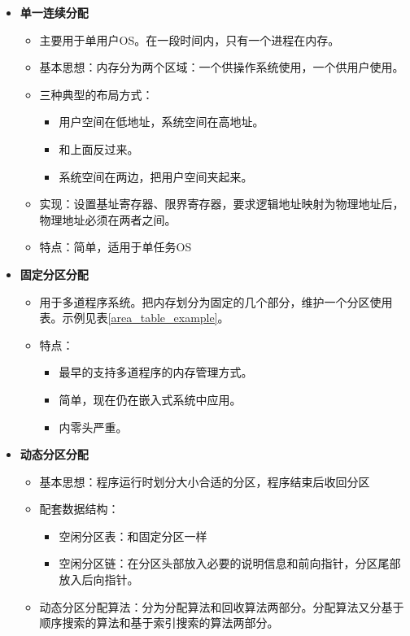 \documentclass[12pt, a4paper, oneside]{ctexart}
\begin{document}
\begin{itemize}
  \item {\bf 单一连续分配}
  \begin{itemize}
    \item 主要用于单用户OS。在一段时间内，只有一个进程在内存。
    \item 基本思想：内存分为两个区域：一个供操作系统使用，一个供用户使用。
    \item 三种典型的布局方式：
    \begin{itemize}
      \item 用户空间在低地址，系统空间在高地址。
      \item 和上面反过来。
      \item 系统空间在两边，把用户空间夹起来。
    \end{itemize}
    \item 实现：设置基址寄存器、限界寄存器，要求逻辑地址映射为物理地址后，物理地址必须在两者之间。
    \item 特点：简单，适用于单任务OS
  \end{itemize}
  \item {\bf 固定分区分配}
  \begin{itemize}
    \item 用于多道程序系统。把内存划分为固定的几个部分，维护一个分区使用表。示例见表\ref{area_table_example}。
    \item 特点：
    \begin{itemize}
      \item 最早的支持多道程序的内存管理方式。
      \item 简单，现在仍在嵌入式系统中应用。
      \item 内零头严重。
    \end{itemize}
  \end{itemize}
  \item {\bf 动态分区分配}
  \begin{itemize}
    \item 基本思想：程序运行时划分大小合适的分区，程序结束后收回分区
    \item 配套数据结构：
    \begin{itemize}
      \item 空闲分区表：和固定分区一样
      \item 空闲分区链：在分区头部放入必要的说明信息和前向指针，分区尾部放入后向指针。
    \end{itemize}
    \item 动态分区分配算法：分为分配算法和回收算法两部分。分配算法又分基于顺序搜索的算法和基于索引搜索的算法两部分。

\end{itemize}
\end{itemize}
\end{document}
